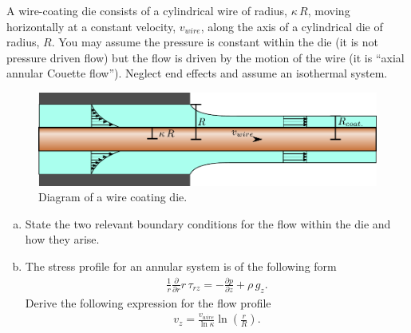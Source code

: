 \documentclass[calculator,datasheet,handbook]{exam}
\begin{document}
\pagebreak
\begin{question}
  A wire-coating die consists of a cylindrical wire of radius,
  $\kappa\,R$, moving horizontally at a constant velocity, $v_{wire}$,
  along the axis of a cylindrical die of radius, $R$. You may assume
  the pressure is constant within the die (it is not pressure driven
  flow) but the flow is driven by the motion of the wire (it is
  ``axial annular Couette flow''). Neglect end effects and assume an
  isothermal system.
  \begin{figure}[ht]%
    \begin{center}%
      \includegraphics[width=0.8\linewidth,clip]{figures/wire_coating_die}%
    \end{center}
    \caption{\label{fig:wire_coating} Diagram of a wire coating die.}
  \end{figure}
  \begin{enumerate}[a)]
  \item State the two relevant boundary conditions for the flow within
    the die and how they arise.  
  \item The stress profile for an annular system is of the following
    form
    \begin{align*}
      \frac{1}{r}\frac{\partial}{\partial r} r\,\tau_{rz} = -\frac{\partial p}{\partial z}+\rho\,g_z.
    \end{align*}
    Derive the following expression for the flow profile
    \begin{align*}
      v_z = \frac{v_{wire}}{\ln \kappa}\ln\left(\frac{r}{R}\right).
    \end{align*}
\end{enumerate}
\end{question}
\end{document}

